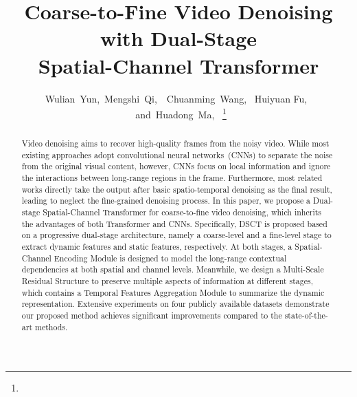 \documentclass[journal]{IEEEtran}
\begin{document}
\title{Coarse-to-Fine Video Denoising with Dual-Stage \protect\\ Spatial-Channel Transformer}
\author{Wulian~Yun,~Mengshi~Qi,~~Chuanming~Wang, ~Huiyuan Fu,~\\~and~Huadong~Ma,~
\thanks{}


}



\maketitle
\begin{abstract}
Video denoising aims to recover high-quality frames from the noisy video. While most existing approaches adopt convolutional neural networks~(CNNs) to separate the noise from the original visual content, however, CNNs focus on local information and ignore the interactions between long-range regions in the frame. Furthermore, most related works directly take the output after basic spatio-temporal denoising as the final result, leading to neglect the fine-grained denoising process. In this paper, we propose a Dual-stage Spatial-Channel Transformer for coarse-to-fine video denoising, which inherits the advantages of both Transformer and CNNs. Specifically, DSCT is proposed based on a progressive dual-stage architecture, namely a coarse-level and a fine-level 
stage to extract dynamic features and static features, respectively. At both stages, a Spatial-Channel Encoding Module is designed to model the long-range contextual dependencies at both spatial and channel levels. Meanwhile, we design a Multi-Scale Residual Structure to preserve multiple aspects of information at different stages, which contains a Temporal Features Aggregation Module to summarize the dynamic representation. Extensive experiments on four publicly available datasets demonstrate our proposed method achieves significant improvements compared to the state-of-the-art methods.
\end{abstract}
\end{document}
